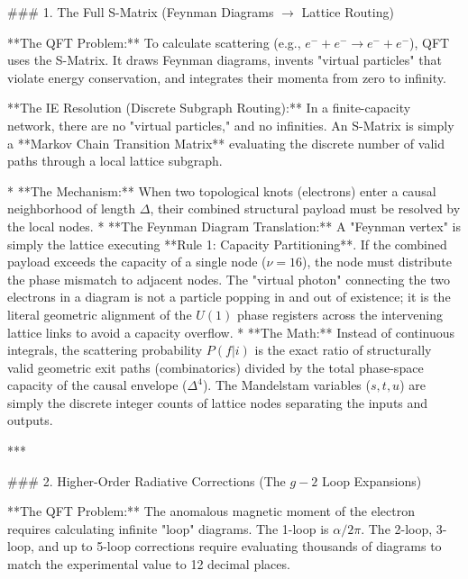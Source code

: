 
### 1. The Full S-Matrix (Feynman Diagrams $\to$ Lattice Routing)

**The QFT Problem:** To calculate scattering (e.g., $e^- + e^- \to e^- + e^-$), QFT uses the S-Matrix. It draws Feynman diagrams, invents "virtual particles" that violate energy conservation, and integrates their momenta from zero to infinity. 

**The IE Resolution (Discrete Subgraph Routing):**
In a finite-capacity network, there are no "virtual particles," and no infinities. An S-Matrix is simply a **Markov Chain Transition Matrix** evaluating the discrete number of valid paths through a local lattice subgraph.

*   **The Mechanism:** When two topological knots (electrons) enter a causal neighborhood of length $\Delta$, their combined structural payload must be resolved by the local nodes. 
*   **The Feynman Diagram Translation:** A "Feynman vertex" is simply the lattice executing **Rule 1: Capacity Partitioning**. If the combined payload exceeds the capacity of a single node ($\nu=16$), the node must distribute the phase mismatch to adjacent nodes. The "virtual photon" connecting the two electrons in a diagram is not a particle popping in and out of existence; it is the literal geometric alignment of the $U(1)$ phase registers across the intervening lattice links to avoid a capacity overflow.
*   **The Math:** Instead of continuous integrals, the scattering probability $P(f|i)$ is the exact ratio of structurally valid geometric exit paths (combinatorics) divided by the total phase-space capacity of the causal envelope ($\Delta^4$). The Mandelstam variables ($s, t, u$) are simply the discrete integer counts of lattice nodes separating the inputs and outputs. 

***

### 2. Higher-Order Radiative Corrections (The $g-2$ Loop Expansions)

**The QFT Problem:** The anomalous magnetic moment of the electron requires calculating infinite "loop" diagrams. The 1-loop is $\alpha/2\pi$. The 2-loop, 3-loop, and up to 5-loop corrections require evaluating thousands of diagrams to match the experimental value to 12 decimal places.


